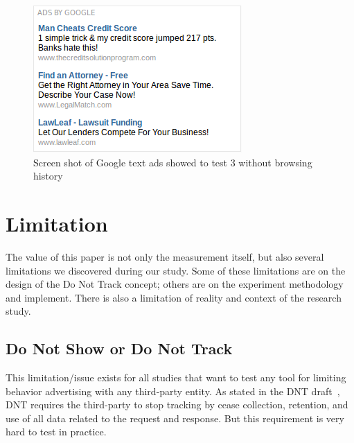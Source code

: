 \documentclass{sig-alternate}
\begin{document}
\begin{figure}
\begin{center}
\includegraphics[width=0.9\columnwidth]{textadrandom}
\end{center}
\caption{Screen shot of Google text ads showed to test 3 without browsing history}
\label{fig:textadrandom}
\end{figure}

\section{Limitation} \label{sec:limitation}

The value of this paper is not only the measurement itself, but also several limitations we discovered during our study. Some of these limitations are on the design of the Do Not Track concept; others are on the experiment methodology and implement. There is also a limitation of reality and context of the research study.

\subsection{Do Not Show or Do Not Track}

This limitation/issue exists for all studies that want to test any tool for limiting behavior advertising with any third-party entity. As stated in the DNT draft~\cite{dntdraft}, DNT requires the third-party to stop tracking by cease collection, retention, and use of all data related to the request and response. But this requirement is very hard to test in practice. 
\end{document}
